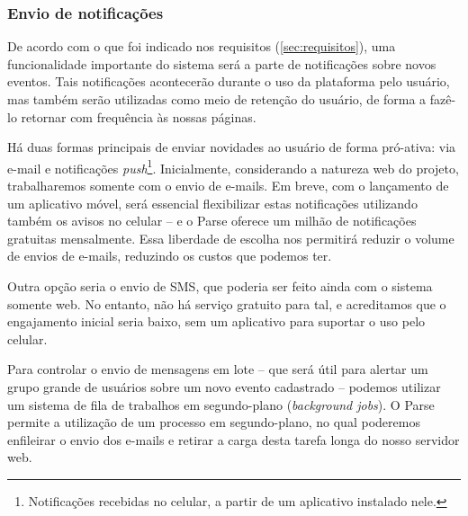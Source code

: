 \documentclass[12pt,a4paper,twoside,hyphens,english,brazil]{abntex2}
\begin{document}
{\subsubsection*{Envio de notificações}
De acordo com o que foi indicado nos requisitos (\autoref{sec:requisitos}), uma funcionalidade importante do sistema será a parte de notificações sobre novos eventos. Tais notificações acontecerão durante o uso da plataforma pelo usuário, mas também serão utilizadas como meio de retenção do usuário, de forma a fazê-lo retornar com frequência às nossas páginas.

Há duas formas principais de enviar novidades ao usuário de forma pró-ativa: via e-mail e notificações \emph{push}\footnote{Notificações recebidas no celular, a partir de um aplicativo instalado nele.}. Inicialmente, considerando a natureza web do projeto, trabalharemos somente com o envio de e-mails. Em breve, com o lançamento de um aplicativo móvel, será essencial flexibilizar estas notificações utilizando também os avisos no celular -- e o Parse oferece um milhão de notificações gratuitas mensalmente. Essa liberdade de escolha nos permitirá reduzir o volume de envios de e-mails, reduzindo os custos que podemos ter.

Outra opção seria o envio de SMS, que poderia ser feito ainda com o sistema somente web. No entanto, não há serviço gratuito para tal, e acreditamos que o engajamento inicial seria baixo, sem um aplicativo para suportar o uso pelo celular.

Para controlar o envio de mensagens em lote -- que será útil para alertar um grupo grande de usuários sobre um novo evento cadastrado -- podemos utilizar um sistema de fila de trabalhos em segundo-plano (\emph{background jobs}). O Parse permite a utilização de um processo em segundo-plano, no qual poderemos enfileirar o envio dos e-mails e retirar a carga desta tarefa longa do nosso servidor web.

}
\end{document}
